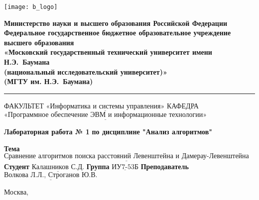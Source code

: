\thispagestyle{empty}

\noindent \begin{minipage}{0.15\textwidth}
	\texttt{[image: b\_logo]}
\end{minipage}
\noindent\begin{minipage}{0.8\textwidth}\centering
	\textbf{Министерство науки и высшего образования Российской Федерации}\\
	\textbf{Федеральное государственное бюджетное образовательное учреждение высшего образования}\\
	\textbf{«Московский государственный технический университет имени Н.Э.~Баумана}\\
	\textbf{(национальный исследовательский университет)»}\\
	\textbf{(МГТУ им. Н.Э.~Баумана)}
\end{minipage}

\noindent\rule{18cm}{3pt}
\newline\newline
\noindent ФАКУЛЬТЕТ $\underline{\text{«Информатика и системы управления»}}$ \newline\newline
\noindent КАФЕДРА $\underline{\text{«Программное обеспечение ЭВМ и информационные технологии»}}$\newline\newline\newline


\begin{center}
	\noindent\begin{minipage}{1.3\textwidth}\centering
		\Large\textbf{  Лабораторная работа № 1}\newline
		\textbf{по дисциплине "Анализ алгоритмов"}\newline\newline
	\end{minipage}
\end{center}

\noindent\textbf{Тема} $\underline{\text{Сравнение алгоритмов поиска расстояний Левенштейна и Дамерау-Левенштейна}}$\newline\newline
\noindent\textbf{Студент} $\underline{\text{Калашников С.Д.}}$\newline\newline
\noindent\textbf{Группа} $\underline{\text{ИУ7-53Б}}$\newline\newline
\noindent\textbf{Преподаватель} $\underline{\text{Волкова Л.Л., Строганов Ю.В.}}$\newline

\begin{center}
	\vfill
	Москва,~\the\year
\end{center}
\clearpage
